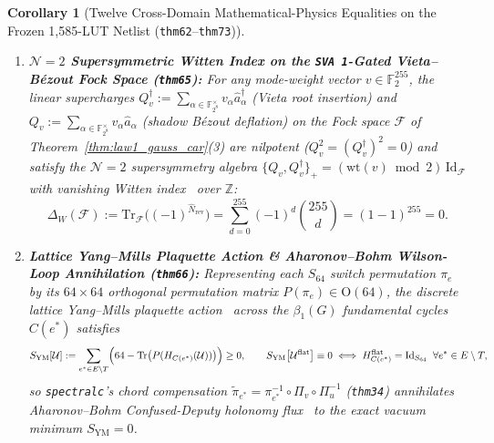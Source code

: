 \documentclass[11pt,letterpaper]{article}
\theoremstyle{spectralthm}
\newtheorem{corollary}[theorem]{Corollary}
\begin{document}
\begin{corollary}[Twelve Cross-Domain Mathematical-Physics Equalities on the Frozen 1,585-LUT Netlist (\texttt{thm62}--\texttt{thm73})]
\begin{enumerate}[leftmargin=1.4em,label=\textup{(\roman*)},topsep=2pt,itemsep=1.5pt]
\begin{equation}
  \end{equation}
  so clamping the boundary source $\Delta B \leftarrow 0$ at the Stage-2 ingress \texttt{LUT6\_2} forces the harmonic bulk field $\phi_I^{\mathrm{harm}} = -L_{II}^{-1}L_{IB}\Delta B \equiv 0$ everywhere in the fabric interior.
  \item \textbf{$\mathcal{N}=2$ Supersymmetric Witten Index on the \texttt{SVA 1\textquotesingle}-Gated Vieta--B\'{e}zout Fock Space (\texttt{thm65}):} For any mode-weight vector $v \in \mathbb{F}_2^{255}$, the linear supercharges $Q_v^\dagger := \sum_{\alpha \in \mathbb{F}_{2^8}^\times} v_\alpha \hat{a}_\alpha^\dagger$ (Vieta root insertion) and $Q_v := \sum_{\alpha \in \mathbb{F}_{2^8}^\times} v_\alpha \hat{a}_\alpha$ (shadow B\'{e}zout deflation) on the Fock space $\mathcal{F}$ of Theorem~\ref{thm:law1_gauss_car}(3) are nilpotent ($Q_v^2 = (Q_v^\dagger)^2 = 0$) and satisfy the $\mathcal{N}=2$ supersymmetry algebra $\{Q_v, Q_v^\dagger\}_+ = (\mathrm{wt}(v)\bmod 2)\,\mathrm{Id}_{\mathcal{F}}$ with vanishing Witten index~\cite{witten1982constraints} over $\mathbb{Z}$:
  \begin{equation}
  \label{eq:witten_index_vieta}
  \Delta_W(\mathcal{F}) := \mathrm{Tr}_{\mathcal{F}}\bigl((-1)^{\hat{N}_{\mathrm{rev}}}\bigr) = \sum_{d=0}^{255}(-1)^d\binom{255}{d} = (1 - 1)^{255} = 0.
  \end{equation}
  \item \textbf{Lattice Yang--Mills Plaquette Action \& Aharonov--Bohm Wilson-Loop Annihilation (\texttt{thm66}):} Representing each $S_{64}$ switch permutation $\pi_e$ by its $64\times 64$ orthogonal permutation matrix $P(\pi_e) \in \mathrm{O}(64)$, the discrete lattice Yang--Mills plaquette action~\cite{wilson1974confinement, kogut1975hamiltonian} across the $\beta_1(G)$ fundamental cycles $C(e^*)$ satisfies
  \begin{equation}
  \label{eq:yang_mills_plaquette}
  S_{\mathrm{YM}}[\mathcal{U}] := \sum_{e^* \in E\setminus T}\Bigl(64 - \mathrm{Tr}\bigl(P(H_{C(e^*)}(\mathcal{U}))\bigr)\Bigr) \ge 0, \qquad S_{\mathrm{YM}}\bigl[\mathcal{U}^{\mathrm{flat}}\bigr] \equiv 0 \iff H_{C(e^*)}^{\mathrm{flat}} = \mathrm{Id}_{S_{64}}\;\;\forall e^*\in E\setminus T,
  \end{equation}
  so \texttt{spectralc}'s chord compensation $\widetilde{\pi}_{e^*} = \pi_{e^*}^{-1}\circ\Pi_v\circ\Pi_u^{-1}$ (\texttt{thm34}) annihilates Aharonov--Bohm Confused-Deputy holonomy flux~\cite{aharonov1959significance} to the exact vacuum minimum $S_{\mathrm{YM}} = 0$.

\end{enumerate}
\end{corollary}
\end{document}

